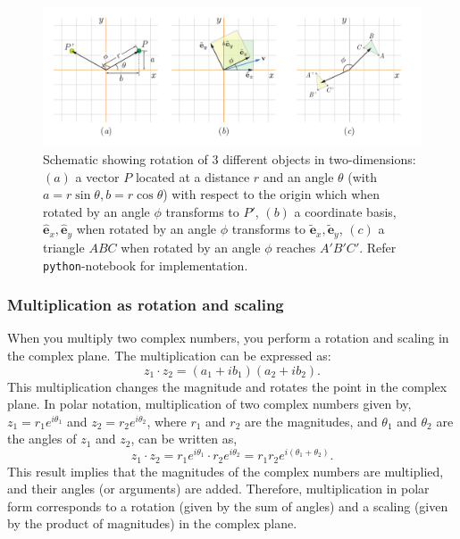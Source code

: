 \documentclass{article}
\def\ehx{\hat{\mathbf{e}}_x}
\def\ehy{\hat{\mathbf{e}}_y}
\def\etx{\tilde{\mathbf{e}}_x}
\def\ety{\tilde{\mathbf{e}}_y}
\begin{document}
\begin{figure}[ht!]
  \centering
  \includegraphics[width=\textwidth]{figs/2Dcomplex.pdf}
  \caption{Schematic showing rotation of 3 different objects in two-dimensions: $(a)$ a vector $P$ located at a distance $r$ and an angle $\theta$ (with $a = r \sin \theta, b = r \cos \theta$) with respect to the origin which when rotated by an angle $\phi$ transforms to $P'$, $(b)$ a coordinate basis, $\ehx, \ehy$ when rotated by an angle $\phi$ transforms to $\etx, \ety$, $(c)$ a triangle $ABC$ when rotated by an angle $\phi$ reaches $A'B'C'$. Refer \texttt{python}-notebook for implementation.}
  \label{fig:schm2D}
\end{figure}

\subsubsection*{Multiplication as rotation and scaling}

When you multiply two complex numbers, you perform a rotation and scaling in the complex plane. The multiplication can be expressed as:
\[
z_1 \cdot z_2 = (a_1 + i b_1)(a_2 + i b_2).
\]
This multiplication changes the magnitude and rotates the point in the complex plane. In polar notation, multiplication of two complex numbers given by, $z_1 = r_1 e^{i\theta_1}$ and $z_2 = r_2 e^{i\theta_2}$, where $r_1$ and $r_2$ are the magnitudes, and $\theta_1$ and $\theta_2$ are the angles of $z_1$ and $z_2$, can be written as,
\begin{equation}
z_1 \cdot z_2 = r_1 e^{i\theta_1} \cdot r_2 e^{i\theta_2} = r_1 r_2 e^{i(\theta_1 + \theta_2)}. \label{eq:compMult}
\end{equation}
This result implies that the magnitudes of the complex numbers are multiplied, and their angles (or arguments) are added. Therefore, multiplication in polar form corresponds to a rotation (given by the sum of angles) and a scaling (given by the product of magnitudes) in the complex plane.
\end{document}
